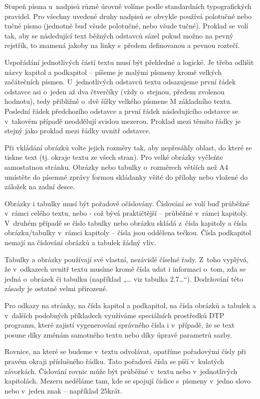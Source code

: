 \documentclass{template/socthesis}
\begin{document}
Stupeň písma u~nadpisů různé úrovně volíme podle standardních typografických pravidel. Pro všechny uvedené druhy nadpisů se obvykle používá polotučné nebo tučné písmo (jednotně buď všude polotučné, nebo všude tučné). Proklad se volí tak, aby se následující text běžných odstavců sázel pokud možno na pevný rejstřík, to znamená jakoby na linky s~předem definovanou a pevnou roztečí.

Uspořádání jednotlivých částí textu musí být přehledné a logické. Je třeba odlišit názvy kapitol a podkapitol – píšeme je malými písmeny kromě velkých začátečních písmen. U~jednotlivých odstavců textu odsazujeme první řádek odstavce asi o~jeden až dva čtverčíky (vždy o~stejnou, předem zvolenou hodnotu), tedy přibližně o~dvě šířky velkého písmene M základního textu. Poslední řádek předchozího odstavce a první řádek následujícího odstavce se v~takovém případě neoddělují svislou mezerou. Proklad mezi těmito řádky je stejný jako proklad mezi řádky uvnitř odstavce.

Při vkládání obrázků volte jejich rozměry tak, aby nepřesáhly oblast, do které se tiskne text (tj. okraje textu ze všech stran). Pro velké obrázky vyčleňte samostatnou stránku. Obrázky nebo tabulky o~rozměrech větších než A4 umístěte do písemné zprávy formou skládanky všité do přílohy nebo vložené do záložek na zadní desce.

Obrázky i tabulky musí být pořadově očíslovány. Číslování se volí buď průběžné v~rámci celého textu, nebo - což bývá praktičtější – průběžné v~rámci kapitoly. V~druhém případě se číslo tabulky nebo obrázku skládá z~čísla kapitoly a čísla obrázku/tabulky v~rámci kapitoly – čísla jsou oddělena tečkou. Čísla podkapitol nemají na číslování obrázků a tabulek žádný vliv.

Tabulky a obrázky používají své vlastní, nezávislé číselné řady. Z~toho vyplývá, že v~odkazech uvnitř textu musíme kromě čísla udat i informaci o~tom, zda se jedná o~obrázek či tabulku (například „… viz tabulka 2.7…“). Dodržování této zásady je ostatně velmi přirozené.

Pro odkazy na stránky, na čísla kapitol a podkapitol, na čísla obrázků a tabulek a v~dalších podobných příkladech využíváme speciálních prostředků DTP programu, které zajistí vygenerování správného čísla i v~případě, že se text posune díky změnám samotného textu nebo díky úpravě parametrů sazby.
 
Rovnice, na které se budeme v~textu odvolávat, opatříme pořadovými čísly při pravém okraji příslušného řádku. Tato pořadová čísla se píší v~kulatých závorkách. Číslování rovnic může být průběžné v~textu nebo v~jednotlivých kapitolách.
Mezeru neděláme tam, kde se spojují číslice s~písmeny v~jedno slovo nebo v~jeden znak – například 25krát.
\end{document}
